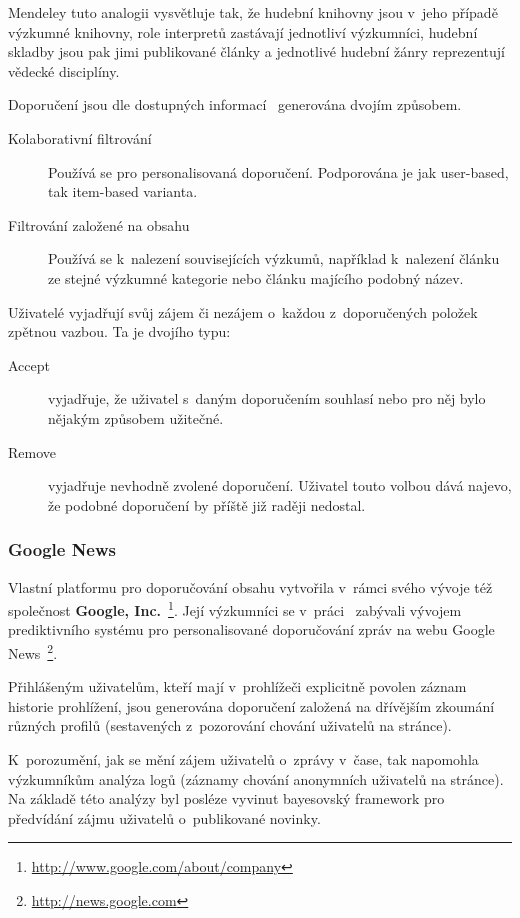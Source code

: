 \documentclass[thesis=M,czech]{FITthesis}[2014/05/07]
\begin{document}
Mendeley tuto analogii vysvětluje tak, že hudební knihovny jsou v~jeho případě výzkumné knihovny, role interpretů zastávají jednotliví výzkumníci, hudební skladby jsou pak jimi publikované články a jednotlivé hudební žánry reprezentují vědecké disciplíny.  

Doporučení jsou dle dostupných informací~\cite{mendeleylastfm} generována dvojím způsobem. 

\begin{description}
	\item[Kolaborativní filtrování] Používá se pro personalisovaná doporučení. Podporována je jak user-based, tak item-based varianta.
	\item[Filtrování založené na obsahu] Používá se k~nalezení souvisejících výzkumů, například k~nalezení článku ze stejné výzkumné kategorie nebo článku majícího podobný název. 
\end{description}

Uživatelé vyjadřují svůj zájem či nezájem o~každou z~doporučených položek zpětnou vazbou. Ta je dvojího typu:

\begin{description}
	\item[Accept] vyjadřuje, že uživatel s~daným doporučením souhlasí nebo pro něj bylo nějakým způsobem užitečné.
	\item[Remove] vyjadřuje nevhodně zvolené doporučení. Uživatel touto volbou dává najevo, že podobné doporučení by příště již raději nedostal.
\end{description}

\subsubsection{Google News}	

Vlastní platformu pro doporučování obsahu vytvořila v~rámci svého vývoje též společnost \textbf{Google, Inc.}~\footnote{\url{http://www.google.com/about/company}}. Její výzkumníci se v~práci~\cite{googlenews} zabývali vývojem prediktivního systému pro personalisované doporučování zpráv na webu Google News~\footnote{\url{http://news.google.com}}.

Přihlášeným uživatelům, kteří mají v~prohlížeči explicitně povolen záznam historie prohlížení, jsou generována doporučení založená na dřívějším zkoumání různých profilů (sestavených z~pozorování chování uživatelů na stránce).  

K~porozumění, jak se mění zájem uživatelů o~zprávy v~čase, tak napomohla výzkumníkům analýza logů (záznamy chování anonymních uživatelů na stránce). Na základě této analýzy byl posléze vyvinut bayesovský framework pro předvídání zájmu uživatelů o~publikované novinky.
\end{document}

